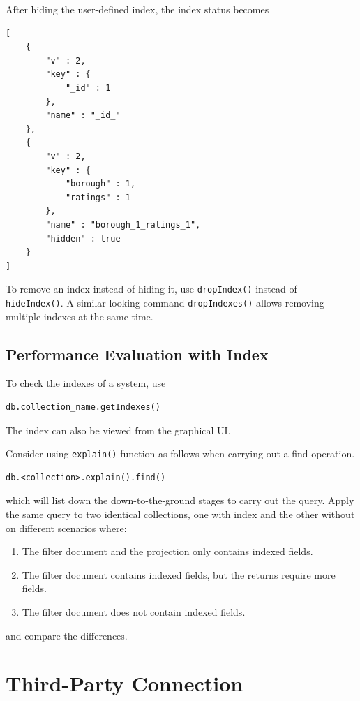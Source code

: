 After hiding the user-defined index, the index status becomes
\begin{lstlisting}
[
	{
		"v" : 2,
		"key" : {
			"_id" : 1
		},
		"name" : "_id_"
	},
	{
		"v" : 2,
		"key" : {
			"borough" : 1,
			"ratings" : 1
		},
		"name" : "borough_1_ratings_1",
		"hidden" : true
	}
]
\end{lstlisting}

To remove an index instead of hiding it, use \verb|dropIndex()| instead of \verb|hideIndex()|. A similar-looking command \verb|dropIndexes()| allows removing multiple indexes at the same time.

\subsection{Performance Evaluation with Index}

To check the indexes of a system, use
\begin{lstlisting}
db.collection_name.getIndexes()
\end{lstlisting}
The index can also be viewed from the graphical UI.

Consider using \verb|explain()| function as follows when carrying out a find operation.
\begin{lstlisting}
db.<collection>.explain().find()
\end{lstlisting}
which will list down the down-to-the-ground stages to carry out the query. Apply the same query to two identical collections, one with index and the other without on different scenarios where:
\begin{enumerate}
	\item The filter document and the projection only contains indexed fields.
	\item The filter document contains indexed fields, but the returns require more fields.
	\item The filter document does not contain indexed fields.
\end{enumerate}
and compare the differences.

\section{Third-Party Connection}

